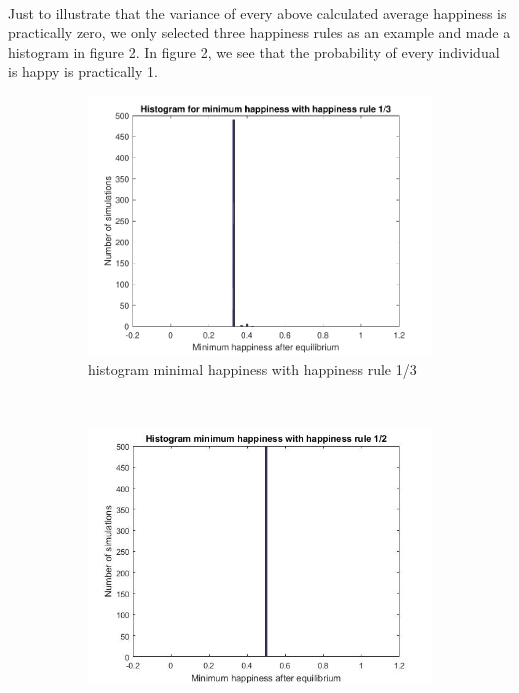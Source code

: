 \\
Just to illustrate that the variance of every above calculated average happiness is practically zero, we only selected three happiness rules as an example and made a histogram in figure 2. In figure 2, we see that the probability of every individual is happy is practically 1.
\newpage
\begin{figure}[H]
    \centering
    \begin{subfigure}{0.32\textwidth}
        \includegraphics[width=\textwidth]{histogram_min_happiness_een_derde}
        \caption{histogram minimal happiness with happiness rule 1/3}
        \label{fig:gull}
    \end{subfigure}
    ~ %
    \begin{subfigure}{0.32\textwidth}
        \includegraphics[width=\textwidth]{histogram_min_happiness_half}

\end{subfigure}
\end{figure}
